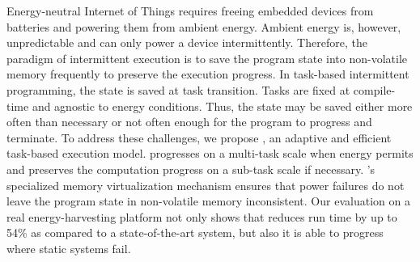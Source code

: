 
Energy-neutral Internet of Things requires freeing embedded devices from batteries and powering them from ambient energy. Ambient energy is, however, unpredictable and can only power a device intermittently. Therefore, the paradigm of intermittent execution is to save the program state into non-volatile memory frequently to preserve the execution progress. In task-based intermittent programming, the state is saved at task transition. Tasks are fixed at compile-time and agnostic to energy conditions. Thus, the state may be saved either more often than necessary or not often enough for the program to progress and terminate. To address these challenges, we propose \sys, an adaptive and efficient task-based execution model. \sys progresses on a multi-task scale when energy permits and preserves the computation progress on a sub-task scale if necessary. \sys's specialized memory virtualization mechanism ensures that power failures do not leave the program state in non-volatile memory inconsistent. Our evaluation on a real energy-harvesting platform not only shows that \sys reduces run time by up to 54\% as compared to a state-of-the-art system, but also it is able to progress where static systems fail.
